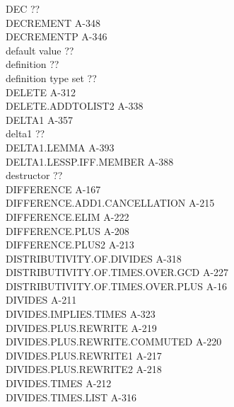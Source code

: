 \documentclass[10pt]{book}
\newenvironment{pubasis}{\begin{flushleft}}{\end{flushleft}}
\begin{document}
\begin{pubasis}
DEC                                          ??\\
DECREMENT                                    A-348\\
DECREMENTP                                   A-346\\
default value                                ??\\
definition                                   ??\\
definition type set                          ??\\
DELETE                                       A-312\\
DELETE.ADDTOLIST2                            A-338\\
DELTA1                                       A-357\\
delta1                                       ??\\
DELTA1.LEMMA                                 A-393\\
DELTA1.LESSP.IFF.MEMBER                      A-388\\
destructor                                   ??\\
DIFFERENCE                                   A-167\\
DIFFERENCE.ADD1.CANCELLATION                 A-215\\
DIFFERENCE.ELIM                              A-222\\
DIFFERENCE.PLUS                              A-208\\
DIFFERENCE.PLUS2                             A-213\\
DISTRIBUTIVITY.OF.DIVIDES                    A-318\\
DISTRIBUTIVITY.OF.TIMES.OVER.GCD             A-227\\
DISTRIBUTIVITY.OF.TIMES.OVER.PLUS            A-16\\
DIVIDES                                      A-211\\
DIVIDES.IMPLIES.TIMES                        A-323\\
DIVIDES.PLUS.REWRITE                         A-219\\
DIVIDES.PLUS.REWRITE.COMMUTED                A-220\\
DIVIDES.PLUS.REWRITE1                        A-217\\
DIVIDES.PLUS.REWRITE2                        A-218\\
DIVIDES.TIMES                                A-212\\
DIVIDES.TIMES.LIST                           A-316\\

\end{pubasis}
\end{document}
